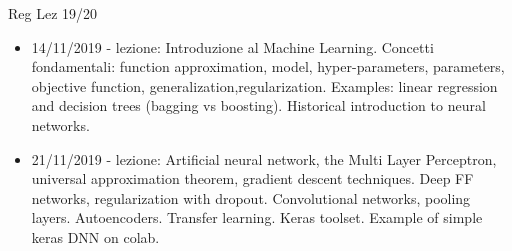 \begin{frame}[allowframebreaks]{Reg Lez 19/20}

\begin{itemize}[resume]
\item 14/11/2019 - lezione: Introduzione al Machine Learning. Concetti fondamentali: function approximation, model, hyper-parameters, parameters, objective function, generalization,regularization. Examples: linear regression and decision trees (bagging vs boosting). Historical introduction to neural networks.
\item 21/11/2019 - lezione: Artificial neural network, the Multi Layer Perceptron, universal approximation theorem, gradient descent techniques. Deep FF networks, regularization with dropout. Convolutional networks, pooling layers. Autoencoders. Transfer learning. Keras toolset. Example of simple keras DNN on colab.
\end{itemize}
\end{frame}